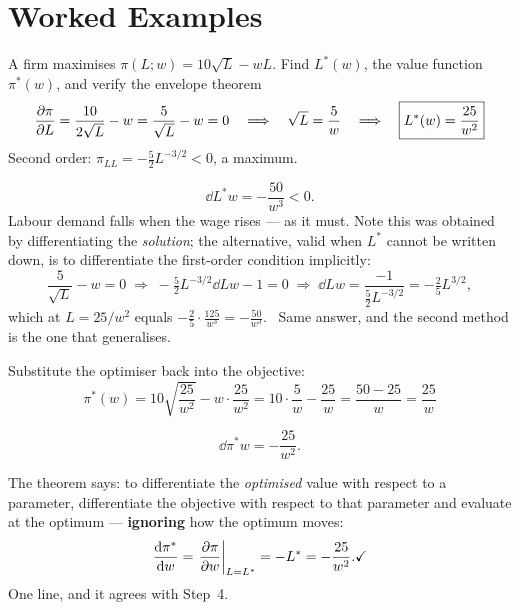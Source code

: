 \section{Worked Examples}

\begin{worked}{A firm maximises $\pi(L;w)=10\sqrt L-wL$. Find $L^{*}(w)$, the value function $\pi^{*}(w)$, and verify the envelope theorem}
\[
  \frac{\partial \pi}{\partial L}=\frac{10}{2\sqrt L}-w=\frac{5}{\sqrt L}-w=0
  \quad\Longrightarrow\quad
  \sqrt L=\frac5w
  \quad\Longrightarrow\quad
  \boxed{L^{*}(w)=\frac{25}{w^{2}}}
\]
Second order: $\pi_{LL}=-\tfrac52L^{-3/2}<0$, a maximum. \checkmark

\[
  \dd{L^{*}}{w}=-\frac{50}{w^{3}}<0 .
\]
Labour demand falls when the wage rises --- as it must. Note this was
obtained by differentiating the \emph{solution}; the alternative, valid when
$L^{*}$ cannot be written down, is to differentiate the first-order
condition implicitly:
\[
  \frac{5}{\sqrt L}-w=0
  \;\Longrightarrow\;
  -\tfrac52L^{-3/2}\dd{L}{w}-1=0
  \;\Longrightarrow\;
  \dd{L}{w}=\frac{-1}{\tfrac52L^{-3/2}}=-\tfrac25L^{3/2} ,
\]
which at $L=25/w^{2}$ equals $-\tfrac25\cdot\frac{125}{w^{3}}=-\frac{50}{w^{3}}$.
\checkmark\ Same answer, and the second method is the one that generalises.

Substitute the optimiser back into the objective:
\[
  \pi^{*}(w)=10\sqrt{\frac{25}{w^{2}}}-w\cdot\frac{25}{w^{2}}
  =10\cdot\frac5w-\frac{25}{w}
  =\frac{50-25}{w}
  =\boxed{\frac{25}{w}}
\]

\[
  \dd{\pi^{*}}{w}=-\frac{25}{w^{2}} .
\]

The theorem says: to differentiate the \emph{optimised} value with respect
to a parameter, differentiate the objective with respect to that parameter
and evaluate at the optimum --- \textbf{ignoring} how the optimum moves:
\[
  \frac{\mathrm{d}\pi^{*}}{\mathrm{d}w}=\left.\frac{\partial \pi}{\partial w}\right|_{L=L^{*}}
  =-L^{*}=-\frac{25}{w^{2}} . \checkmark
\]
One line, and it agrees with Step~4.


\end{worked}
